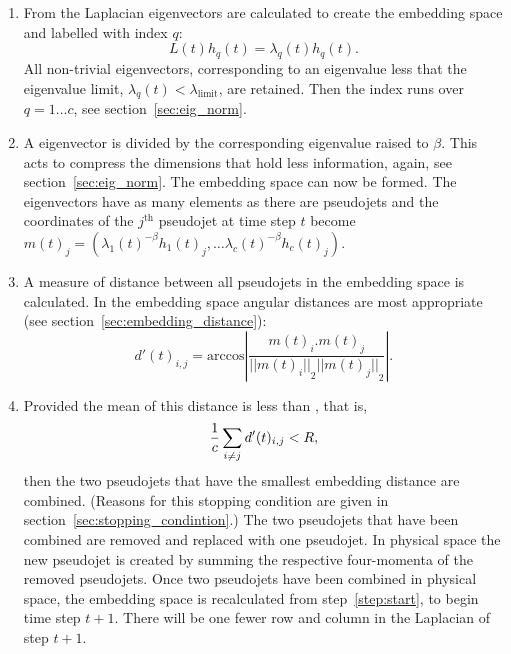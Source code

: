 \begin{enumerate}
    \item \label{step:eigenvectors} From the Laplacian eigenvectors are calculated to create the embedding space and labelled with index \(q\):
            \begin{equation}
                L(t)h_q(t) = \lambda_q(t) h_q(t).
            \end{equation}
            All non-trivial eigenvectors, corresponding
            to an eigenvalue less that the eigenvalue limit, \(\lambda_q(t) < \lambda_\text{limit}\),
            are retained.
            Then the index runs over \(q = 1 \dots c\),
            see section~\ref{sec:eig_norm}.

        \item \label{step:compression} A eigenvector is divided by the corresponding eigenvalue raised to \(\beta\).
            This acts to compress the dimensions that hold less information, again, see section~\ref{sec:eig_norm}.
            The embedding space can now be formed.
            The eigenvectors have as many elements as there are pseudojets and the coordinates of
            the \(j^\text{th}\) pseudojet at time step \(t\)
            become \(m(t)_j = \left(\lambda_1(t)^{-\beta} h_1(t)_j, \dots \lambda_c(t)^{-\beta} h_c(t)_j\right)\).

        \item  A measure of distance between all pseudojets in the embedding space is calculated.
            In the embedding space angular distances are most appropriate (see section~\ref{sec:embedding_distance}):
            \begin{equation}
                d'(t)_{i, j} = \text{arccos}\left|\frac{m(t)_i.m(t)_j}{{||m(t)_i||}_2 {||m(t)_j||}_2}\right|.
            \end{equation}

        \item\label{step:stoppingcondition}

            Provided the mean of this distance is less than \stoppingdeltar{}, that is,
            \begin{equation}
                \frac{1}{c}\sum_{i\ne j} d'(t)_{i, j} < R{},
            \end{equation}
            then the two pseudojets that have the smallest embedding distance are combined.
            (Reasons for this stopping condition are given in section~\ref{sec:stopping_condintion}.)
        The two pseudojets that have been combined are removed and replaced with one pseudojet.
        In physical space the new pseudojet is created by summing the respective four-momenta of the removed pseudojets.
        Once two pseudojets have been combined in physical space, the embedding space is recalculated from step~\ref{step:start}, 
        to begin time step \(t+1\).
        There will be one fewer row and column in the Laplacian of step \(t+1\).
     \end{enumerate}
